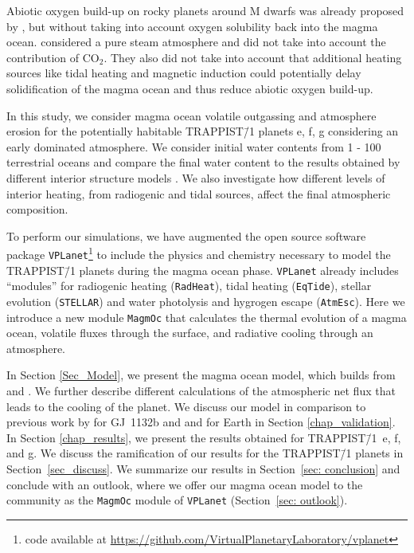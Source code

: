 \documentclass[paper=letterpaper,fontsize=12pt,oneside,twocolumn]{article}
\newcommand{\vplanet}{\texttt{\footnotesize{VPLanet}}}
\newcommand{\atmesc}{\texttt{\footnotesize{AtmEsc}}}
\newcommand{\eqtide}{\texttt{\footnotesize{EqTide}}}
\newcommand{\radheat}{\texttt{\footnotesize{RadHeat}}}
\newcommand{\stellar}{\texttt{\footnotesize{STELLAR}}}
\newcommand{\magmoc}{\texttt{\footnotesize{MagmOc}}}
\newcommand{\eg}{e.g. }
\begin{document}
Abiotic oxygen build-up on rocky planets around M dwarfs was already proposed by \citet{Luger2015a}, but without taking into account oxygen solubility back into the magma ocean.  considered a pure steam atmosphere and did not take into account the contribution of $\mathrm{CO_2}$. They also did not take into account that additional heating sources like tidal heating \citep[\eg][]{Driscoll2015} and magnetic induction \citep{Kislyakova2017} could potentially delay solidification of the magma ocean and thus reduce abiotic oxygen build-up.

In this study, we consider magma ocean volatile outgassing and atmosphere erosion for the potentially habitable TRAPPIST\=/1 planets e, f, g considering an early  dominated atmosphere. We consider initial water contents from 1 - 100 terrestrial oceans and compare the final water content to the results obtained by different interior structure models \citep{Noack2016,barr2018interior,Dorn2018,Unterborn2018b}. We also investigate how different levels of interior heating, from radiogenic and tidal sources, affect the final atmospheric composition.

To perform our simulations, we have augmented the open source software package \vplanet{}\footnote{code available at \url{https://github.com/VirtualPlanetaryLaboratory/vplanet}} \citep{Barnes2020} to include the physics and chemistry necessary to model the TRAPPIST\=/1 planets during the magma ocean phase. \vplanet{} already includes ``modules'' for radiogenic heating (\radheat{}), tidal heating (\eqtide{}), stellar evolution (\stellar{}) and water photolysis and hygrogen escape (\atmesc{}). Here we introduce a new module \magmoc{} that calculates the thermal evolution of a magma ocean, volatile fluxes through the surface, and radiative cooling through an  atmosphere.

In Section \ref{Sec_Model}, we present the magma ocean model, which builds from \citet{Schaefer2016} and \citet{Elkins-Tanton2008}. We further describe different calculations of the atmospheric net flux that leads to the cooling of the planet. 
We discuss our model in comparison to previous work by \citet{Schaefer2016} for GJ~1132b and \citet{Elkins-Tanton2008} and \citet{Hamano2013} for Earth in Section \ref{chap_validation}.
In Section \ref{chap_results}, we present the results obtained for TRAPPIST\=/1~e, f, and g. We discuss the ramification of our results for the TRAPPIST\=/1 planets in Section~\ref{sec_discuss}.
We summarize our results in Section~\ref{sec: conclusion} and conclude with an outlook, where we offer our magma ocean model to the community as the \magmoc{} module of \vplanet{}  (Section~\ref{sec: outlook}).
\end{document}
